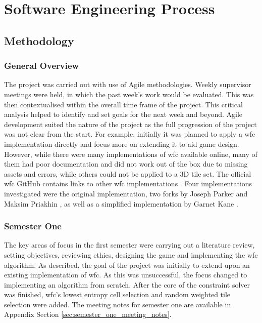 \chapter{Software Engineering Process}
\section{Methodology}
\subsection{General Overview}
The project was carried out with use of Agile methodologies. Weekly supervisor meetings were held, in which the past week's work would be evaluated. This was then contextualised within the overall time frame of the project. This critical analysis helped to identify and set goals for the next week and beyond. Agile development suited the nature of the project as the full progression of the project was not clear from the start. For example, initially it was planned to apply a \acrlong{wfc} implementation directly and focus more on extending it to aid game design. However, while there were many implementations of \acrshort{wfc} available online, many of them had poor documentation and did not work out of the box due to missing assets and errors, while others could not be applied to a 3D tile set. The official \acrlong{wfc} GitHub contains links to other \acrshort{wfc} implementations \cite{Gumin_Wave_Function_Collapse_2016}. Four implementations investigated were the original implementation, two forks by Joseph Parker \cite{unity-WFC} and Maksim Priakhin \cite{unity-WFC-3D}, as well as a simplified implementation by Garnet Kane \cite{Easy_WFC}.

\subsection{Semester One}
The key areas of focus in the first semester were carrying out a literature review, setting objectives, reviewing ethics, designing the game and implementing the \acrshort{wfc} algorithm. As described, the goal of the project was initially to extend upon an existing implementation of \acrshort{wfc}. As this was unsuccessful, the focus changed to implementing an algorithm from scratch. After the core of the constraint solver was finished, \acrshort{wfc}'s lowest entropy cell selection and random weighted tile selection were added. The meeting notes for semester one are available in Appendix Section \ref{sec:semester_one_meeting_notes}.

